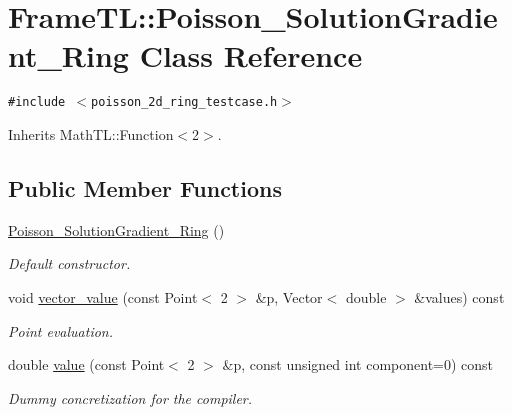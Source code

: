 \hypertarget{classFrameTL_1_1Poisson__SolutionGradient__Ring}{
\section{FrameTL::Poisson\_\-SolutionGradient\_\-Ring Class Reference}
\label{classFrameTL_1_1Poisson__SolutionGradient__Ring}
}
{\tt \#include $<$poisson\_\-2d\_\-ring\_\-testcase.h$>$}

Inherits MathTL::Function$<$2$>$.

\subsection*{Public Member Functions}
\begin{CompactItemize}
\item 
\hypertarget{classFrameTL_1_1Poisson__SolutionGradient__Ring_fb73f6d089a77501101f71d4fd3f4f3e}{
\hyperlink{classFrameTL_1_1Poisson__SolutionGradient__Ring_fb73f6d089a77501101f71d4fd3f4f3e}{Poisson\_\-SolutionGradient\_\-Ring} ()}
\label{classFrameTL_1_1Poisson__SolutionGradient__Ring_fb73f6d089a77501101f71d4fd3f4f3e}

\begin{CompactList}\small\item\em Default constructor. \item\end{CompactList}\item 
\hypertarget{classFrameTL_1_1Poisson__SolutionGradient__Ring_61766e593c955c0cbe82853b333be951}{
void \hyperlink{classFrameTL_1_1Poisson__SolutionGradient__Ring_61766e593c955c0cbe82853b333be951}{vector\_\-value} (const Point$<$ 2 $>$ \&p, Vector$<$ double $>$ \&values) const }
\label{classFrameTL_1_1Poisson__SolutionGradient__Ring_61766e593c955c0cbe82853b333be951}

\begin{CompactList}\small\item\em Point evaluation. \item\end{CompactList}\item 
\hypertarget{classFrameTL_1_1Poisson__SolutionGradient__Ring_7dec31ebbc9bf605c9a2c6d35dee014a}{
double \hyperlink{classFrameTL_1_1Poisson__SolutionGradient__Ring_7dec31ebbc9bf605c9a2c6d35dee014a}{value} (const Point$<$ 2 $>$ \&p, const unsigned int component=0) const }
\label{classFrameTL_1_1Poisson__SolutionGradient__Ring_7dec31ebbc9bf605c9a2c6d35dee014a}

\begin{CompactList}\small\item\em Dummy concretization for the compiler. \item\end{CompactList}\end{CompactItemize}


